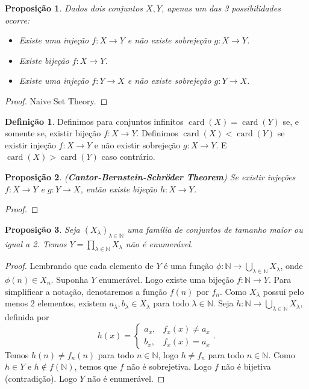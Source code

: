 \documentclass{article}
\newtheorem{prop}{Proposição}[section]
\theoremstyle{theorem}
\theoremstyle{lemma}
\theoremstyle{definition}
\newtheorem{definicao}{Definição}[section]
\theoremstyle{remark}
\DeclareMathOperator{\card}{card}
\begin{document}
\begin{prop}
	Dados dois conjuntos $X,Y$, apenas um das 3 possibilidades ocorre: 
	\begin{itemize}
		\item Existe uma injeção $f: X \to Y$ e não existe sobrejeção $g: X \to Y$.
		\item Existe bijeção $f: X\to Y$. 
		\item Existe uma injeção $f: Y \to X$ e não existe sobrejeção $g: Y \to X$.
	\end{itemize}
\end{prop}
\begin{proof}
	Naive Set Theory. %
\end{proof}
\begin{definicao}
	Definimos para conjuntos infinitos $\card(X) = \card(Y)$ se, e somente se, existir bijeção $f: X\to Y$. Definimos $\card(X) < \card(Y)$ se existir injeção $f: X \to Y$ e não existir sobrejeção $g:X \to Y$. E $\card(X) > \card(Y)$ caso contrário.
\end{definicao}
\begin{prop}
	(\textbf{Cantor-Bernstein-Schröder Theorem}) Se existir injeções $f:X\to Y$ e $g: Y \to X$, então existe bijeção $h:X\to Y$.
\end{prop}
\begin{proof}
\end{proof}
\begin{prop}
	Seja $(X_{\lambda})_{\lambda \in \mathbb{N}}$ uma família de conjuntos de tamanho maior ou igual a 2. Temos $Y = \displaystyle\prod_{\lambda \in \mathbb{N}} X_{\lambda}$ não é enumerável.
\end{prop}
\begin{proof}
	Lembrando que cada elemento de $Y$ é uma função $\phi: \mathbb{N} \to\displaystyle\bigcup_{\lambda \in \mathbb{N}} X_{\lambda}$, onde $\phi(n) \in X_n$. Suponha $Y$ enumerável. Logo existe uma bijeção $f: \mathbb{N} \to Y$. Para simplificar a notação, denotaremos a função $f(n)$ por $f_n$.  Como $X_{\lambda}$ possui pelo menos 2 elementos, existem $a_\lambda, b_\lambda \in X_{\lambda}$ para todo $\lambda\in \mathbb{N}$. Seja $h: \mathbb{N} \to \displaystyle\bigcup_{\lambda \in \mathbb{N}} X_{\lambda}$, definida por $$h(x) = \begin{cases} a_x , & f_x(x) \neq a_x\\ b_x, & f_x(x) = a_x \end{cases}.$$
		Temos $h(n) \neq f_n(n)$ para todo $n\in \mathbb{N}$, logo $h \neq f_n$ para todo $n\in \mathbb{N}$. Como $h\in Y$ e $h \not \in f(\mathbb{N})$, temos que $f$ não é sobrejetiva. Logo $f$ não é bijetiva (contradição). Logo $Y$ não é enumerável.
\end{proof}
\end{document}
